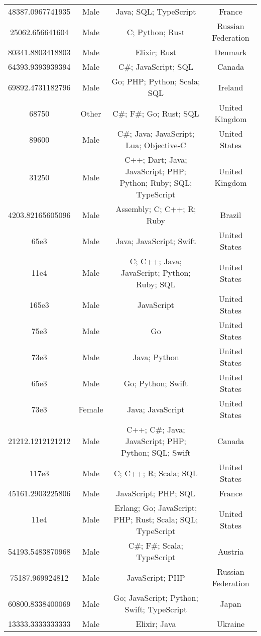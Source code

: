 \begin{center}
\begin{tabular}{ |c|c|c|c| }
48387.0967741935  &  Male  &  Java; SQL; TypeScript  &  France  \\ 
25062.656641604  &  Male  &  C; Python; Rust  &  Russian Federation  \\ 
80341.8803418803  &  Male  &  Elixir; Rust  &  Denmark  \\ 
64393.9393939394  &  Male  &  C\#; JavaScript; SQL  &  Canada  \\ 
69892.4731182796  &  Male  &  Go; PHP; Python; Scala; SQL  &  Ireland  \\ 
68750  &  Other  &  C\#; F\#; Go; Rust; SQL  &  United Kingdom  \\ 
89600  &  Male  &  C\#; Java; JavaScript; Lua; Objective-C  &  United States  \\ 
31250  &  Male  &  C++; Dart; Java; JavaScript; PHP; Python; Ruby; SQL; TypeScript  &  United Kingdom  \\ 
4203.82165605096  &  Male  &  Assembly; C; C++; R; Ruby  &  Brazil  \\ 
65e3  &  Male  &  Java; JavaScript; Swift  &  United States  \\ 
11e4  &  Male  &  C; C++; Java; JavaScript; Python; Ruby; SQL  &  United States  \\ 
165e3  &  Male  &  JavaScript  &  United States  \\ 
75e3  &  Male  &  Go  &  United States  \\ 
73e3  &  Male  &  Java; Python  &  United States  \\ 
65e3  &  Male  &  Go; Python; Swift  &  United States  \\ 
73e3  &  Female  &  Java; JavaScript  &  United States  \\ 
21212.1212121212  &  Male  &  C++; C\#; Java; JavaScript; PHP; Python; SQL; Swift  &  Canada  \\ 
117e3  &  Male  &  C; C++; R; Scala; SQL  &  United States  \\ 
45161.2903225806  &  Male  &  JavaScript; PHP; SQL  &  France  \\ 
11e4  &  Male  &  Erlang; Go; JavaScript; PHP; Rust; Scala; SQL; TypeScript  &  United States  \\ 
54193.5483870968  &  Male  &  C\#; F\#; Scala; TypeScript  &  Austria  \\ 
75187.969924812  &  Male  &  JavaScript; PHP  &  Russian Federation  \\ 
60800.8338400069  &  Male  &  Go; JavaScript; Python; Swift; TypeScript  &  Japan  \\ 
13333.3333333333  &  Male  &  Elixir; Java  &  Ukraine  \\ 

\end{tabular}
\end{center}
